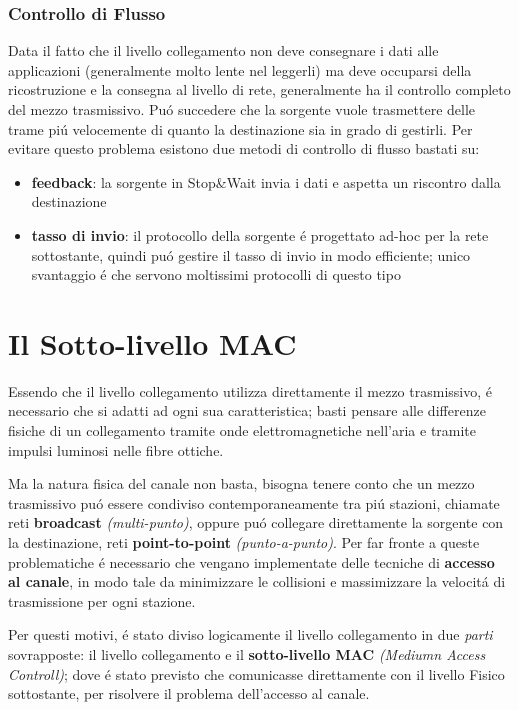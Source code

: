\documentclass[12pt]{article}
\begin{document}
\subsubsection{Controllo di Flusso}\label{livello-collegamento-funzioni-controllo-di-flusso}
Data il fatto che il livello collegamento non deve consegnare i dati alle applicazioni (generalmente molto lente nel 
leggerli) ma  deve occuparsi della ricostruzione e la consegna al livello di rete, generalmente ha il controllo completo del 
mezzo trasmissivo. Pu\'o succedere che la sorgente vuole trasmettere delle trame pi\'u velocemente di quanto la destinazione 
sia in grado di gestirli. Per evitare questo problema esistono due metodi di controllo di flusso bastati su:
\begin{itemize}[noitemsep]
	\item \textbf{feedback}: la sorgente in Stop\&Wait invia i dati e aspetta un riscontro dalla destinazione
	\item \textbf{tasso di invio}: il protocollo della sorgente \'e progettato ad-hoc per la rete sottostante, quindi 
	      pu\'o gestire il tasso di invio in modo efficiente; unico svantaggio \'e che servono moltissimi protocolli di 
	      questo tipo
\end{itemize}



\clearpage
\section{Il Sotto-livello MAC}\label{mac}
Essendo che il livello collegamento utilizza direttamente il mezzo trasmissivo, \'e necessario che si adatti ad ogni sua 
caratteristica; basti pensare alle differenze fisiche di un collegamento tramite onde elettromagnetiche nell'aria e tramite 
impulsi luminosi nelle fibre ottiche.

Ma la natura fisica del canale non basta, bisogna tenere conto che un mezzo trasmissivo pu\'o essere condiviso 
contemporaneamente tra pi\'u stazioni, chiamate reti \textbf{broadcast} \textit{(multi-punto)}, oppure pu\'o collegare 
direttamente la sorgente con la destinazione, reti \textbf{point-to-point} \textit{(punto-a-punto)}. Per far fronte a queste 
problematiche \'e necessario che vengano implementate delle tecniche di \textbf{accesso al canale}, in modo tale da 
minimizzare le collisioni e massimizzare la velocit\'a di trasmissione per ogni stazione.

Per questi motivi, \'e stato diviso logicamente il livello collegamento in due \textit{parti} sovrapposte: il livello 
collegamento e il \textbf{sotto-livello MAC} \textit{(Mediumn Access Controll)}; dove \'e stato previsto che comunicasse 
direttamente con il livello Fisico sottostante, per risolvere il problema dell'accesso al canale.
\end{document}
